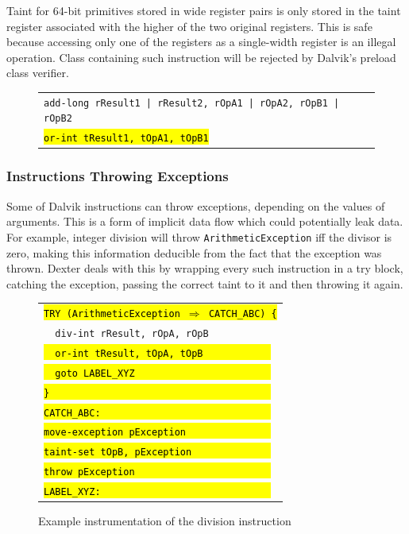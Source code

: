 \documentclass[12pt,twoside,notitlepage]{report}
\newcommand{\centerbox}[1] {
	\begin{center}
	\begin{footnotesize}
	\begin{tabular}{l}
		#1
	\end{tabular}
	\end{footnotesize}
	\end{center}
}
\newcommand{\asm}[1] {\texttt{#1}}
\newcommand{\asmExtra}[1] {\texttt{\hl{#1}}}
\begin{document}
Taint for 64-bit primitives stored in wide register pairs is only stored in the taint register associated with the higher of the two original registers. This is safe because accessing only one of the registers as a single-width register is an illegal operation. Class containing such instruction will be rejected by Dalvik's preload class verifier.

	\begin{figure}[H]
		\centerbox{
			\asm{add-long rResult1 | rResult2, rOpA1 | rOpA2, rOpB1 | rOpB2} \\
			\asmExtra{or-int tResult1, tOpA1, tOpB1}
		}
	\end{figure}

\subsubsection{Instructions Throwing Exceptions}

Some of Dalvik instructions can throw exceptions, depending on the values of arguments. This is a form of implicit data flow which could potentially leak data. For example, integer division will throw \verb$ArithmeticException$ iff the divisor is zero, making this information deducible from the fact that the exception was thrown. Dexter deals with this by wrapping every such instruction in a try block, catching the exception, passing the correct taint to it and then throwing it again.

	\begin{figure}[H]
		\centerbox{
			\asmExtra{TRY (ArithmeticException $\Rightarrow$ CATCH\_ABC) \{} \\
			\asm{~~div-int rResult, rOpA, rOpB} \\
			\asmExtra{~~or-int tResult, tOpA, tOpB~~~~~~~~~~~~} \\
			\asmExtra{~~goto LABEL\_XYZ~~~~~~~~~~~~~~~~~~~~~~~~} \\
			\asmExtra{\}~~~~~~~~~~~~~~~~~~~~~~~~~~~~~~~~~~~~~~~} \\
			\asmExtra{CATCH\_ABC:~~~~~~~~~~~~~~~~~~~~~~~~~~~~~~} \\
			\asmExtra{move-exception pException~~~~~~~~~~~~~~~} \\
			\asmExtra{taint-set tOpB, pException~~~~~~~~~~~~~~} \\
			\asmExtra{throw pException~~~~~~~~~~~~~~~~~~~~~~~~} \\	
			\asmExtra{LABEL\_XYZ:~~~~~~~~~~~~~~~~~~~~~~~~~~~~~~}
		}
		\caption{Example instrumentation of the division instruction}
		\label{figure:TaintPropagation_ThrowingInstructions}
	\end{figure}
\end{document}
